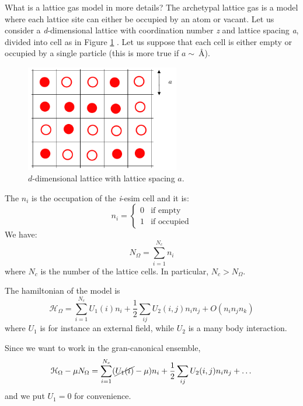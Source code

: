 \documentclass[../main/main.tex]{subfiles}
\begin{document}
 What is a lattice gas model in more details?
 The archetypal lattice gas is a model where each lattice site can either be occupied by an atom or vacant.
 Let us consider a \emph{d}-dimensional lattice with coordination number \emph{z} and lattice spacing \emph{a}, divided into cell as in Figure \ref{fig:6_1} . Let us suppose that each cell is either empty or occupied by a single particle (this is more true if \( a \sim \SI{}{\angstrom}  \)).

 \begin{figure}[h!]
 \centering
 \includegraphics[width=0.6\textwidth]{../lessons/6_image/1.pdf}
 \caption{\label{fig:6_1} \( d \)-dimensional lattice with lattice spacing \( a \).}
 \end{figure}

 \noindent The \( n_i \) is the occupation of the \emph{i}-esim cell and it is:
\begin{equation}
n_i =
  \begin{cases}
   0 & \text{if empty} \\
   1 & \text{if occupied}
  \end{cases}
\end{equation}
We have:
\begin{equation}
  N _ \Omega = \sum_{i=1}^{N_c} n_i
\end{equation}
where \( N_c \) is the number of the lattice cells. In particular, \( N_c > N_{\Omega } \).

The hamiltonian of the model is
\begin{equation}
  \mathcal{H}_ \Omega  = \sum_{i=1}^{N_c} U_1 (i) n_i + \frac{1}{2} \sum_{ij}^{} U_2 (i,j) n_i n_j + O (n_i n_j n_k)
\end{equation}
where \( U_1 \) is for instance an external field, while \( U_2 \) is a many body interaction.

Since we want to work in the gran-canonical ensemble,
\begin{equation}
  \mathcal{H}_ \Omega  - \mu N_ \Omega  = \sum_{i=1}^{N_c} ( \cancel{ U_1 (i)} - \mu) n_i + \frac{1}{2} \sum_{ij}^{} U_2 (i,j) n_i n_j +   \dots
\end{equation}
and we put \( U_1=0 \) for convenience.
\end{document}
